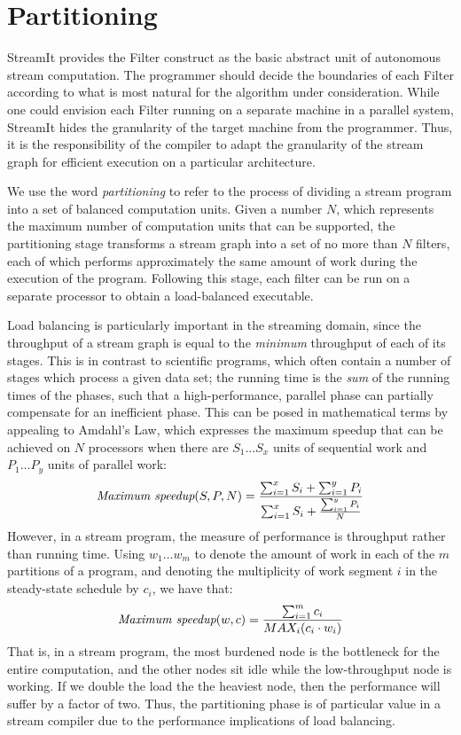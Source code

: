 \section{Partitioning}
\label{sec:partition}

StreamIt provides the Filter construct as the basic abstract unit of
autonomous stream computation.  The programmer should decide the
boundaries of each Filter according to what is most natural for the
algorithm under consideration.  While one could envision each Filter
running on a separate machine in a parallel system, StreamIt hides the
granularity of the target machine from the programmer.  Thus, it is
the responsibility of the compiler to adapt the granularity of the
stream graph for efficient execution on a particular architecture.

We use the word {\it partitioning} to refer to the process of dividing
a stream program into a set of balanced computation units.  Given a
number $N$, which represents the maximum number of computation units
that can be supported, the partitioning stage transforms a stream
graph into a set of no more than $N$ filters, each of which performs
approximately the same amount of work during the execution of the
program.  Following this stage, each filter can be run on a separate
processor to obtain a load-balanced executable.

Load balancing is particularly important in the streaming domain,
since the throughput of a stream graph is equal to the {\it minimum}
throughput of each of its stages.  This is in contrast to scientific
programs, which often contain a number of stages which process a given
data set; the running time is the {\it sum} of the running times of
the phases, such that a high-performance, parallel phase can partially
compensate for an inefficient phase.  This can be posed in
mathematical terms by appealing to Amdahl's Law, which expresses the
maximum speedup that can be achieved on $N$ processors when there are
$S_1 \dots S_x$ units of sequential work and $P_1 \dots P_y$ units of
parallel work:
\begin{align*}
\mbox{\it Maximum speedup}(S, P, N) = \frac{\sum_{i=1}^x{S_i}+\sum_{i=1}^y{P_i}}{\sum_{i=1}^x{S_i}+\frac{\sum_{i=1}^y{P_i}}{N}}
\end{align*}
However, in a stream program, the measure of performance is throughput
rather than running time.  Using $w_1 \dots w_m$ to denote the amount
of work in each of the $m$ partitions of a program, and denoting the
multiplicity of work segment $i$ in the steady-state schedule by
$c_i$, we have that:
\begin{align*}
\mbox{\it Maximum speedup}(w, c) = \frac{\sum_{i=1}^m{c_i}}{MAX_i(c_i \cdot w_i)}
\end{align*}
That is, in a stream program, the most burdened node is the bottleneck
for the entire computation, and the other nodes sit idle while the
low-throughput node is working.  If we double the load the the
heaviest node, then the performance will suffer by a factor of two.
Thus, the partitioning phase is of particular value in a stream
compiler due to the performance implications of load balancing.

